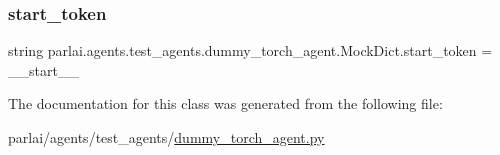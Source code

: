 \subsubsection{\texorpdfstring{start\+\_\+token}{start\_token}}
{\footnotesize\ttfamily string parlai.\+agents.\+test\+\_\+agents.\+dummy\+\_\+torch\+\_\+agent.\+Mock\+Dict.\+start\+\_\+token = \textquotesingle{}\+\_\+\+\_\+start\+\_\+\+\_\+\textquotesingle{}\hspace{0.3cm}{\ttfamily [static]}}



The documentation for this class was generated from the following file\+:\begin{DoxyCompactItemize}
\item 
parlai/agents/test\+\_\+agents/\hyperlink{dummy__torch__agent_8py}{dummy\+\_\+torch\+\_\+agent.\+py}\end{DoxyCompactItemize}
